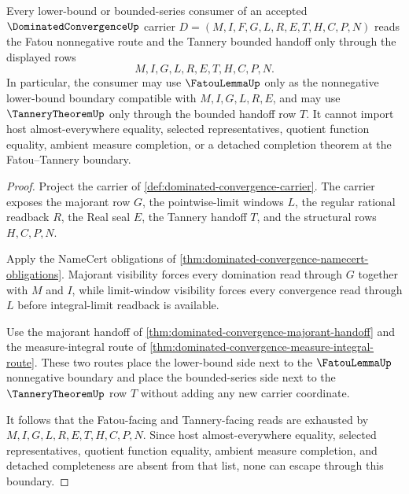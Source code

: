 \begin{theorem}
\label{thm:dominated-convergence-fatou-tannery-nonescape}
Every lower-bound or bounded-series consumer of an accepted $\DominatedConvergenceUp$ carrier $D=(M,I,F,G,L,R,E,T,H,C,P,N)$ reads the Fatou nonnegative route and the Tannery bounded handoff only through the displayed rows
$$
M,I,G,L,R,E,T,H,C,P,N .
$$
In particular, the consumer may use $\FatouLemmaUp$ only as the nonnegative lower-bound boundary compatible with $M,I,G,L,R,E$, and may use $\TanneryTheoremUp$ only through the bounded handoff row $T$. It cannot import host almost-everywhere equality, selected representatives, quotient function equality, ambient measure completion, or a detached completion theorem at the Fatou--Tannery boundary.
\end{theorem}
\begin{proof}
Project the carrier of \autoref{def:dominated-convergence-carrier}. The carrier exposes the majorant row $G$, the pointwise-limit windows $L$, the regular rational readback $R$, the Real seal $E$, the Tannery handoff $T$, and the structural rows $H,C,P,N$.

Apply the NameCert obligations of \autoref{thm:dominated-convergence-namecert-obligations}. Majorant visibility forces every domination read through $G$ together with $M$ and $I$, while limit-window visibility forces every convergence read through $L$ before integral-limit readback is available.

Use the majorant handoff of \autoref{thm:dominated-convergence-majorant-handoff} and the measure-integral route of \autoref{thm:dominated-convergence-measure-integral-route}. These two routes place the lower-bound side next to the $\FatouLemmaUp$ nonnegative boundary and place the bounded-series side next to the $\TanneryTheoremUp$ row $T$ without adding any new carrier coordinate.

It follows that the Fatou-facing and Tannery-facing reads are exhausted by $M,I,G,L,R,E,T,H,C,P,N$. Since host almost-everywhere equality, selected representatives, quotient function equality, ambient measure completion, and detached completeness are absent from that list, none can escape through this boundary.
\end{proof}


